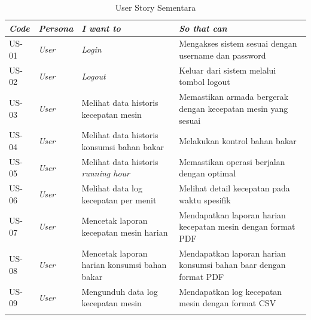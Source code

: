     \begin{longtable}[!h]
        {
            p{}
            p{}
            p{}
            p{}
        }
            \toprule
            \textit{Code} &
            \textit{Persona} &
            \textit{I want to} &
            \textit{So that can} \\ [0.5ex]
            \midrule

            US-01 &
            \textit{User} &
            \textit{Login} &
            Mengakses sistem sesuai dengan username dan password
            \\

            US-02 &
            \textit{User} &
            \textit{Logout} &
            Keluar dari sistem melalui tombol logout \\

            US-03 &
            \textit{User} &
            Melihat data historis kecepatan mesin &
            Memastikan armada bergerak dengan kecepatan mesin yang sesuai
            \\

            US-04 &
            \textit{User} &
            Melihat data historis konsumsi bahan bakar &
            Melakukan kontrol bahan bakar
            \\

            US-05 &
            \textit{User} &
            Melihat data historis \textit{running hour} &
            Memastikan operasi berjalan dengan optimal
            \\

            US-06 &
            \textit{User} &
            Melihat data log kecepatan per menit &
            Melihat detail kecepatan pada waktu spesifik
            \\

            US-07 &
            \textit{User} &
            Mencetak laporan kecepatan mesin harian &
            Mendapatkan laporan harian kecepatan mesin dengan format PDF
            \\

            US-08 &
            \textit{User} &
            Mencetak laporan harian konsumsi bahan bakar &
            Mendapatkan laporan harian konsumsi bahan baar dengan format PDF
            \\

            US-09 &
            \textit{User} &
            Mengunduh data log kecepatan mesin &
            Mendapatkan log kecepatan mesin dengan format CSV
            \\ [1ex]
            \bottomrule
        \caption{User Story Sementara}
        \label{tab:user-story}
    \end{longtable}

